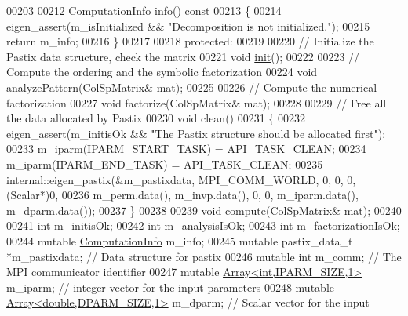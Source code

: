 \begin{DoxyCode}
00203     
\hyperlink{class_eigen_1_1_pastix_base_a436e99a385c9c019be9627cc1fa884cf}{00212}     \hyperlink{group__enums_ga85fad7b87587764e5cf6b513a9e0ee5e}{ComputationInfo} \hyperlink{class_eigen_1_1_pastix_base_a436e99a385c9c019be9627cc1fa884cf}{info}()\textcolor{keyword}{ const}
00213 \textcolor{keyword}{    }\{
00214       eigen\_assert(m\_isInitialized && \textcolor{stringliteral}{"Decomposition is not initialized."});
00215       \textcolor{keywordflow}{return} m\_info;
00216     \}
00217     
00218   \textcolor{keyword}{protected}:
00219 
00220     \textcolor{comment}{// Initialize the Pastix data structure, check the matrix}
00221     \textcolor{keywordtype}{void} \hyperlink{structinit}{init}(); 
00222     
00223     \textcolor{comment}{// Compute the ordering and the symbolic factorization}
00224     \textcolor{keywordtype}{void} analyzePattern(ColSpMatrix& mat);
00225     
00226     \textcolor{comment}{// Compute the numerical factorization}
00227     \textcolor{keywordtype}{void} factorize(ColSpMatrix& mat);
00228     
00229     \textcolor{comment}{// Free all the data allocated by Pastix}
00230     \textcolor{keywordtype}{void} clean()
00231     \{
00232       eigen\_assert(m\_initisOk && \textcolor{stringliteral}{"The Pastix structure should be allocated first"}); 
00233       m\_iparm(IPARM\_START\_TASK) = API\_TASK\_CLEAN;
00234       m\_iparm(IPARM\_END\_TASK) = API\_TASK\_CLEAN;
00235       internal::eigen\_pastix(&m\_pastixdata, MPI\_COMM\_WORLD, 0, 0, 0, (Scalar*)0,
00236                              m\_perm.data(), m\_invp.data(), 0, 0, m\_iparm.data(), m\_dparm.data());
00237     \}
00238     
00239     \textcolor{keywordtype}{void} compute(ColSpMatrix& mat);
00240     
00241     \textcolor{keywordtype}{int} m\_initisOk; 
00242     \textcolor{keywordtype}{int} m\_analysisIsOk;
00243     \textcolor{keywordtype}{int} m\_factorizationIsOk;
00244     \textcolor{keyword}{mutable} \hyperlink{group__enums_ga85fad7b87587764e5cf6b513a9e0ee5e}{ComputationInfo} m\_info; 
00245     \textcolor{keyword}{mutable} pastix\_data\_t *m\_pastixdata; \textcolor{comment}{// Data structure for pastix}
00246     \textcolor{keyword}{mutable} \textcolor{keywordtype}{int} m\_comm; \textcolor{comment}{// The MPI communicator identifier}
00247     \textcolor{keyword}{mutable} \hyperlink{group___core___module}{Array<int,IPARM\_SIZE,1>} m\_iparm; \textcolor{comment}{// integer vector for the input
       parameters}
00248     \textcolor{keyword}{mutable} \hyperlink{group___core___module}{Array<double,DPARM\_SIZE,1>} m\_dparm; \textcolor{comment}{// Scalar vector for the input
}
\end{DoxyCode}
